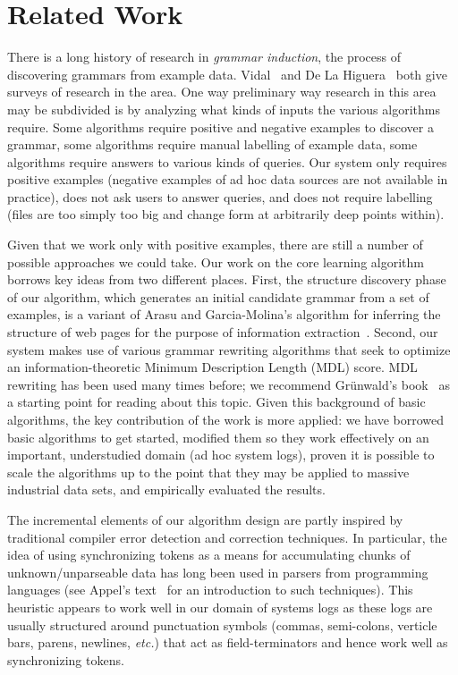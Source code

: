 \section{Related Work}
\label{sec:related}

There is a long history of research in {\em grammar induction},
the process of discovering grammars from example data.  
Vidal~\cite{vidal:gisurvey} and
De La Higuera~\cite{higuera01current} both give surveys
of research in the area.  One way preliminary way research in this area
may be subdivided is by analyzing what kinds of inputs
the various algorithms require.  Some algorithms
require positive and negative examples to discover a grammar, some
algorithms require manual labelling of example data, some algorithms
require answers to various kinds of queries.  Our system only
requires positive examples (negative examples of ad hoc data sources 
are not available in practice), does not ask users to answer queries,
and does not require labelling (files are too simply too
big and change form at arbitrarily deep points within).  

Given that we work only with positive examples, there
are still a number of possible approaches we could take.
Our work on the core learning algorithm
borrows key ideas from two different places.
First, the structure discovery phase of our algorithm, which
generates an initial candidate grammar from a set of examples,
is a variant of Arasu and Garcia-Molina's algorithm 
for inferring the structure of web pages for the purpose
of information extraction~\cite{arasu+:sigmod03}.
Second, our system makes use of various grammar
rewriting algorithms that seek to optimize an information-theoretic
Minimum Description Length (MDL) score.  MDL rewriting has been
used many times before; we recommend Gr\"{u}nwald's book~\cite{mdlbook}
as a starting point for reading about this topic.
Given this background of basic algorithms, the key contribution
of the work is more applied:  we have borrowed basic algorithms to get
started, modified them so they work effectively on an important,
understudied domain (ad hoc system logs),
proven it is possible to scale the algorithms up
to the point that they may be applied to massive industrial data
sets, and empirically evaluated the results.

The incremental elements of our algorithm design are partly
inspired by traditional compiler error detection and correction
techniques.  In particular, the idea of using synchronizing tokens
as a means for accumulating chunks of unknown/unparseable data
has long been used in parsers from programming languages
(see Appel's text~\cite{appel:modern-compiler} for an
introduction to such techniques).  This heuristic appears to
work well in our domain of systems logs as these logs are
usually structured around punctuation symbols (commas, semi-colons,
verticle bars, parens, newlines, {\em etc.}) that act as
field-terminators and hence work well as synchronizing tokens.

